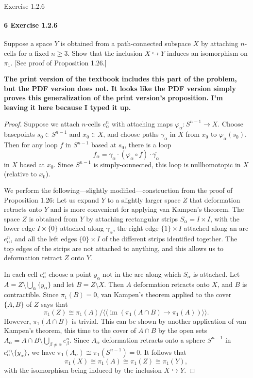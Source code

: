 \documentclass[12pt]{article}
\newlength{\myparskip}
\newenvironment{fullbox}{\begin{lrbox}{\savefullbox}\begin{minipage}{\dimexpr\textwidth-2\fboxsep\relax}\setlength{\parskip}{\myparskip}}{\end{minipage}\end{lrbox}\framebox[\textwidth]{\usebox{\savefullbox}}}
\newenvironment{pbox}[1][]{\begin{fullbox}\ifx#1\empty\else\paragraph{#1}\phantom{}\fi}{\end{fullbox}}
\theoremstyle{definition}
\renewcommand{\phi}{\varphi}
\newcommand{\<}{\langle}
\renewcommand{\>}{\rangle}
\newcommand{\isom}{\cong}
\DeclareMathOperator{\im}{im}
\newcommand{\inc}{\hookrightarrow}
\newcommand{\ovl}{\overline}
\begin{document}
\newpage
\begin{pbox}[6 Exercise 1.2.6]
    Suppose a space $Y$ is obtained from a path-connected subspace $X$ by attaching $n$-cells for a fixed $n \geq 3$.
    Show that the inclusion $X \inc Y$ induces an isomorphism on $\pi_1$.
    [See proof of Proposition 1.26.]
\end{pbox}

\textbf{The print version of the textbook includes this part of the problem, but the PDF version does not.
It looks like the PDF version simply proves this generalization of  the print version's proposition.
I'm leaving it here because I typed it up.} 

\begin{proof}
    Suppose we attach $n$-cells $e^n_\alpha$ with attaching maps $\phi_\alpha : S^{n-1} \to X$.
    Choose basepoints $s_0 \in S^{n-1}$ and $x_0 \in X$, and choose paths $\gamma_\alpha$ in $X$ from $x_0$ to $\phi_\alpha(s_0)$.
    Then for any loop $f$ in $S^{n-1}$ based at $s_0$, there is a loop
    \[
        f_\alpha = \gamma_\alpha \cdot (\phi_\alpha \circ f) \cdot \ovl{\gamma_\alpha}
    \]
    in $X$ based at $x_0$.
    Since $S^{n-1}$ is simply-connected, this loop is nullhomotopic in $X$ (relative to $x_0$).

    We perform the following---slightly modified---construction from the proof of Proposition 1.26:
    Let us expand $Y$ to a slightly larger space $Z$ that deformation retracts onto $Y$ and is more convenient for applying van Kampen's theorem.
    The space $Z$ is obtained from $Y$ by attaching rectangular strips $S_\alpha = I \times I$, with the lower edge $I \times \{0\}$ attached along $\gamma_\alpha$, the right edge $\{1\} \times I$ attached along an arc $e^n_\alpha$, and all the left edges $\{0\} \times I$ of the different strips identified together.
    The top edges of the strips are not attached to anything, and this allows us to deformation retract $Z$ onto $Y$.

    In each cell $e^n_\alpha$ choose a point $y_\alpha$ not in the arc along which $S_\alpha$ is attached.
    Let $A = Z \setminus \bigcup_\alpha\{y_\alpha\}$ and let $B = Z \setminus X$.
    Then $A$ deformation retracts onto $X$, and $B$ is contractible.
    Since $\pi_1(B) = 0$, van Kampen's theorem applied to the cover $\{A, B\}$ of $Z$ says that
    \[
        \pi_1(Z) \isom \pi_1(A) / \<\!\<\im(\pi_1(A \cap B) \to \pi_1(A))\>\!\>.
    \]
    However, $\pi_1(A \cap B)$ is trivial.
    This can be shown by another application of van Kampen's theorem, this time to the cover of $A \cap B$ by the open sets $A_\alpha = A \cap B \setminus \bigcup_{\beta \ne \alpha} e^n_\beta$.
    Since $A_\alpha$ deformation retracts onto a sphere $S^{n-1}$ in $e^n_\alpha \setminus \{y_\alpha\}$, we have $\pi_1(A_\alpha) \isom \pi_1(S^{n-1}) = 0$.
    It follows that
    \[
        \pi_1(X) \isom \pi_1(A) \isom \pi_1(Z) \isom \pi_1(Y),
    \]
    with the isomorphism being induced by the inclusion $X \inc Y$.
\end{proof}
\end{document}
